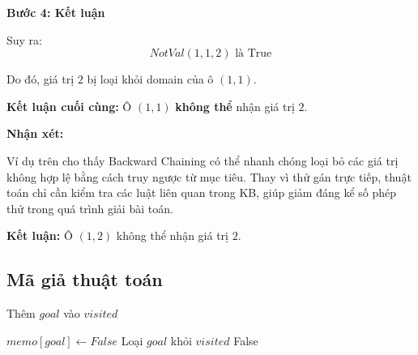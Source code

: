 \textbf{Bước 4: Kết luận}

Suy ra:
\[
NotVal(1,1,2) \text{ là True}
\]

Do đó, giá trị $2$ bị loại khỏi domain của ô $(1,1)$.

\textbf{Kết luận cuối cùng:} Ô $(1,1)$ \textbf{không thể} nhận giá trị $2$.

\textbf{Nhận xét:}

Ví dụ trên cho thấy Backward Chaining có thể nhanh chóng loại bỏ các giá trị không hợp lệ bằng cách truy ngược từ mục tiêu. Thay vì thử gán trực tiếp, thuật toán chỉ cần kiểm tra các luật liên quan trong KB, giúp giảm đáng kể số phép thử trong quá trình giải bài toán.

\textbf{Kết luận:} Ô $(1,2)$ không thể nhận giá trị $2$.

\subsection{Mã giả thuật toán}
\begin{algorithm}[H]
\footnotesize
\caption{Backward Chaining}





Thêm $goal$ vào $visited$ \;



$memo[goal] \leftarrow False$ \;
Loại $goal$ khỏi $visited$ \;
\Return False \;

\end{algorithm}

